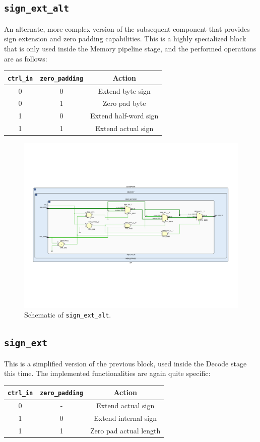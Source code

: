 \subsection{\texttt{sign\_ext\_alt}}
\label{alternate}
An alternate, more complex version of the subsequent component that provides sign extension and zero padding capabilities. This is a highly specialized block that is only used inside the Memory pipeline stage, and the performed operations are as follows:
\begin{table}[!ht]
\centering
\begin{tabular}{cc|c}
\toprule
\texttt{ctrl\_in} & \texttt{zero\_padding} & Action\\
\midrule
0 & 0 & Extend byte sign\\
0 & 1 & Zero pad byte\\
1 & 0 & Extend half-word sign\\
1 & 1 & Extend actual sign\\
\bottomrule
\end{tabular}
\end{table}

\begin{figure}[!ht]
\centering
\includegraphics[width=\textwidth]{./chapters/figures/sign_ext_alt.pdf} 
\caption{Schematic of \texttt{sign\_ext\_alt}.}
\end{figure}

\subsection{\texttt{sign\_ext}}
This is a simplified version of the previous block, used inside the Decode stage this time. The implemented functionalities are again quite specific:
\begin{table}[!ht]
\centering
\begin{tabular}{cc|c}
\toprule
\texttt{ctrl\_in} & \texttt{zero\_padding} & Action\\
\midrule
0 & - & Extend actual sign\\
1 & 0 & Extend internal sign\\
1 & 1 & Zero pad actual length\\
\bottomrule
\end{tabular}
\end{table}

